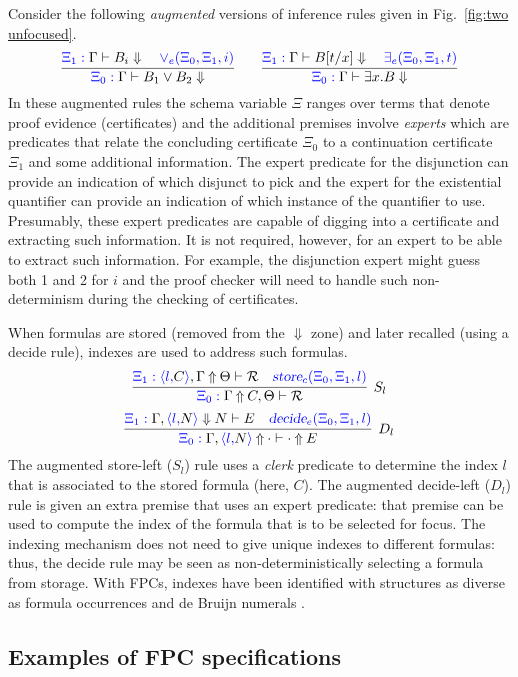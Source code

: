 \documentclass{llncs}
\begin{document}
Consider the following \emph{augmented} versions of inference
rules given in Fig.~\ref{fig:two unfocused}.
\[
\infer{\bXi0 \jRf{\Gamma}{B_1\lor B_2}}
      {\bXi1 \jRf{\Gamma}{B_i}\quad \blue{\orExpert{\Xi_0}{\Xi_1}{i}}}
\qquad
\infer{\bXi0 \jRf{\Gamma}{\exists x.B}}
      {\bXi1 \jRf{\Gamma}{B[t/x]}\quad\blue{\someExpert{\Xi_0}{\Xi_1}{t}}}
\]
In these augmented rules the schema variable $\Xi$ ranges over terms
that denote proof evidence (certificates) and the additional premises
involve \emph{experts} which are predicates that relate the concluding
certificate $\Xi_0$ to a continuation certificate $\Xi_1$ and some
additional information.
%
The expert predicate for the disjunction can provide an indication of
which disjunct to pick and the expert for the existential quantifier
can provide an indication of which instance of the quantifier to use.
%
Presumably, these expert predicates are capable of digging into a
certificate and extracting such information.
%
It is not required, however, for an expert to be able to extract
such information.
%
For example, the disjunction expert might guess both 1 and 2 for $i$
and the proof checker will need to handle such non-determinism during
the checking of certificates.

When formulas are stored (removed from the $\Downarrow$ zone) and
later recalled (using a decide rule), indexes are used to address such
formulas. 
\[
  \infer[S_l]{\bXi0 \jUnfamb{\Gamma}{C,\Theta}{\null}}
             {\bXi1 \jUnfamb{\tupp{l}{C},\Gamma}{\Theta}{\null}\quad
              \blue{\storeClerk{\Xi_0}{\Xi_1}{l}}}
\]
\[
  \infer[D_l]{\bXi0 \jUnf{\Gamma,\tupp{l}{N}}{\cdot}{\cdot}{E}}
             {\bXi1 \jLf{\Gamma,\tupp{l}{N}}{N}{E}\quad
              \blue{\decideExpert{\Xi_0}{\Xi_1}{l}}}
\]
The augmented store-left ($S_l$) rule uses a \emph{clerk} predicate
to determine the index $l$ that is associated to the stored formula
(here, $C$).  The augmented decide-left ($D_l$) rule is given an extra
premise that uses an expert predicate: that premise can be used to
compute the index of the formula that is to be selected for focus.
%
The indexing mechanism does not need to give unique indexes to
different formulas: thus, the decide rule may be seen as
non-deterministically selecting a formula from storage.
%
With FPCs, indexes have been identified with
structures as diverse as formula occurrences and de Bruijn numerals
\cite{chihani17jar}.


\subsection{Examples of FPC specifications}
\end{document}
